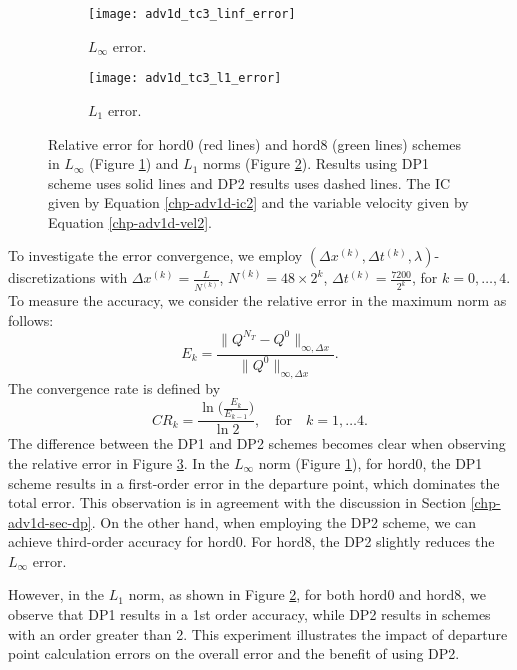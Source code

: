 \begin{figure}[!htb]
	\centering
	\begin{subfigure}{0.45\textwidth}
		\centering
		\texttt{[image: adv1d\_tc3\_linf\_error]}
		\caption{$L_{\infty}$ error.\label{chp-adv1d-sec-exp-adv2-error-linf}}
	\end{subfigure}
	\begin{subfigure}{0.45\textwidth}
		\centering
		\texttt{[image: adv1d\_tc3\_l1\_error]}
		\caption{$L_1$ error.\label{chp-adv1d-sec-exp-adv2-error-l1}}
	\end{subfigure}
	\caption{Relative error for hord0 (red lines) and hord8 (green lines) schemes
	         in $L_{\infty}$
	         (Figure \ref{chp-adv1d-sec-exp-adv2-error-linf})
	         and $L_1$ norms
                 (Figure \ref{chp-adv1d-sec-exp-adv2-error-l1}).
	        Results using DP1 scheme uses solid lines and DP2 results uses dashed lines.
		The IC given by Equation
		\eqref{chp-adv1d-ic2} and the variable 
		velocity given by Equation \eqref{chp-adv1d-vel2}.\label{chp-adv1d-sec-exp-adv2-2}}
\end{figure}

To investigate the error convergence, we employ $(\Delta x^{(k)}, \Delta t^{(k)}, \lambda)$-discretizations with $\Delta x^{(k)} = \frac{L}{N^{(k)}}$,
$N^{(k)} = 48 \times 2^k$,
$\Delta t^{(k)}=\frac{7200}{{2^{k}}}$, for $k = 0, \ldots, 4$.
To measure the accuracy, we consider the relative error in the maximum norm as follows:
\begin{equation*}
	E_k = 
	\frac{\| Q^{N_T} - Q^0 \|_{\infty, \Delta x}}{\|Q^0\|_{\infty, \Delta x}}.
\end{equation*}
The convergence rate is defined by
\begin{equation*}
	CR_k = \frac{\ln{\bigg(\frac{E_{k}}{E_{k-1}}}\bigg)}{\ln 2}, \quad \text{for} \quad k = 1, \ldots 4.
\end{equation*}
The difference between the DP1 and DP2 schemes becomes clear when observing the relative error in Figure \ref{chp-adv1d-sec-exp-adv2-2}.
In the $L_{\infty}$ norm (Figure \ref{chp-adv1d-sec-exp-adv2-error-linf}), 
for hord0, the DP1 scheme results in a first-order error in the departure point, which dominates the total error.
This observation is in agreement with the discussion in Section \ref{chp-adv1d-sec-dp}.
On the other hand, when employing the DP2 scheme, we can achieve third-order accuracy for hord0.
For hord8, the DP2 slightly reduces the $L_{\infty}$ error.

However, in the $L_1$ norm, as shown in Figure \ref{chp-adv1d-sec-exp-adv2-error-l1}, 
for both hord0 and hord8, we observe that DP1 results in a 1st order accuracy, 
while DP2 results in schemes with an order greater than 2.
This experiment illustrates the impact of departure point calculation errors on the overall error and the benefit of using DP2.

